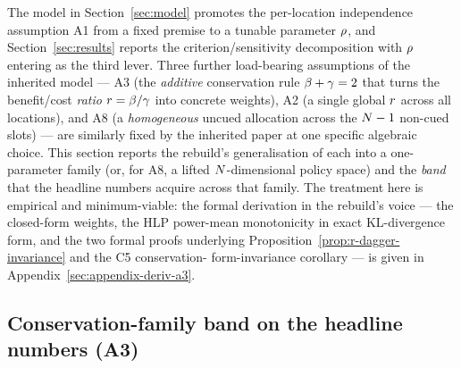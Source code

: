 The model in Section~\ref{sec:model} promotes the per-location
independence assumption A1 from a fixed premise to a tunable parameter
$\rho$, and Section~\ref{sec:results} reports the criterion/sensitivity
decomposition with $\rho$ entering as the third lever. Three further
load-bearing assumptions of the inherited model — A3 (the
\emph{additive} conservation rule $\beta + \gamma = 2$ that turns the
benefit/cost \emph{ratio} $r = \beta/\gamma$ into concrete weights),
A2 (a single global $r$ across all locations), and A8 (a
\emph{homogeneous} uncued allocation across the $N - 1$ non-cued
slots) — are similarly fixed by the inherited paper at one specific
algebraic choice. This section reports the rebuild's generalisation of
each into a one-parameter family (or, for A8, a lifted
$N$-dimensional policy space) and the \emph{band} that the
headline numbers acquire across that family. The treatment here is
empirical and minimum-viable: the formal derivation in the rebuild's
voice — the closed-form weights, the HLP power-mean monotonicity in
exact KL-divergence form, and the two formal proofs underlying
Proposition~\ref{prop:r-dagger-invariance} and the C5 conservation-
form-invariance corollary — is given in
Appendix~\ref{sec:appendix-deriv-a3}.

\subsection{Conservation-family band on the headline numbers (A3)}
\label{sec:extensions-a3}

